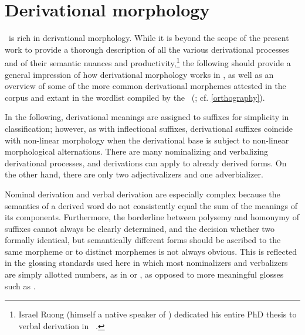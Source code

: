 


\chapter{Derivational morphology}\label{derivMorph}
\PS\ is rich in derivational morphology. While it is beyond the scope of the present work to provide a thorough description of all the various derivational processes and of their semantic nuances and productivity,\footnote{Israel Ruong (himself a native speaker of \PS) dedicated his entire PhD thesis to verbal derivation in \PS\ \citep{Ruong1943}.} %
the following should provide a general impression of how derivational morphology works in \PS, as well as an overview of some of the more common derivational morphemes attested in the corpus and extant in the wordlist compiled by the \WLP\ (\cite{insamlingPS2011}; cf. \SEC\ref{orthography}). 

In the following, derivational meanings are assigned to suffixes for simplicity in classification; however, as with inflectional suffixes, derivational suffixes coincide with non-linear morphology when the derivational base is subject to non-linear morphological alternations. %
There are many nominalizing and verbalizing derivational processes, and derivations can apply to already derived forms. 
On the other hand, there are only two adjectivalizers and one adverbializer. 

Nominal derivation and verbal derivation are especially complex because the semantics of a derived word do not consistently equal the sum of the meanings of its components. Furthermore, the borderline between polysemy and homonymy of suffixes cannot always be clearly determined, and the decision whether two formally identical, but semantically different forms should be ascribed to the same morpheme or to distinct morphemes is not always obvious. 
This is reflected in the glossing standards used here in which most nominalizers and verbalizers are simply allotted numbers, as in  or , as opposed to more meaningful glosses such as . 

